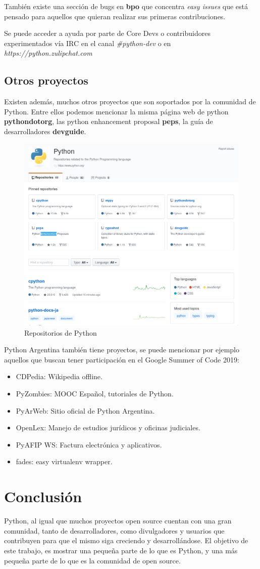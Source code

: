 \documentclass[12pt,a4paper,titlepage]{article}
\begin{document}
También existe una sección de bugs en \textbf{bpo} que concentra \textit{easy issues}
que está pensado para aquellos que quieran realizar sus primeras contribuciones.

Se puede acceder a ayuda por parte de Core Devs o contribuidores experimentados vía
IRC en el canal \textit{\#python-dev} o en \textit{https://python.zulipchat.com}

\subsection{Otros proyectos}

Existen además, muchos otros proyectos que son soportados por la comunidad de Python.
Entre ellos podemos mencionar la misma página web de python \textbf{pythondotorg},
las python enhancement proposal \textbf{peps}, la guía de
desarrolladores \textbf{devguide}.

\begin{figure}[H]
	\centering
	\includegraphics[width=0.7\linewidth]{repositories}
	\caption{Repositorios de Python}
	\label{fig:repositories}
\end{figure}

Python Argentina también tiene proyectos, se puede mencionar por ejemplo aquellos 
que buscan tener participación en el Google Summer of Code 2019:
\begin{itemize}
	\item CDPedia: Wikipedia offline.
	\item PyZombies: MOOC Español, tutoriales de Python.
	\item PyArWeb: Sitio oficial de Python Argentina.
	\item OpenLex: Manejo de estudios jurídicos y oficinas judiciales.
	\item PyAFIP WS: Factura electrónica y aplicativos.
	\item fades: easy virtualenv wrapper.
\end{itemize}
\section{Conclusión}
Python, al igual que muchos proyectos open source cuentan con una gran comunidad,
tanto de desarrolladores, como divulgadores y usuarios que contribuyen para que 
el mismo siga creciendo y desarrollándose. El objetivo de este trabajo, es mostrar
una pequeña parte de lo que es Python, y una más pequeña parte de lo que es la 
comunidad de open source.
\end{document}
